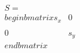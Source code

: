 \documentclass[preview]{standalone}
\begin{document}
\begin{align*}
S = \\begin{bmatrix} s_x & 0 \\\\ 0 & s_y \\end{bmatrix}
\end{align*}
\end{document}
